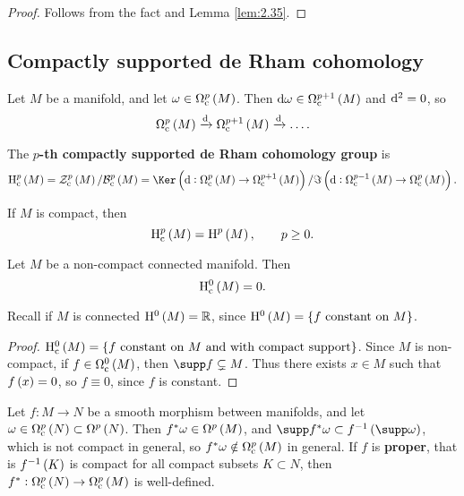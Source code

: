 \begin{proof}
Follows from the fact and Lemma \ref{lem:2.35}.
\end{proof}

\subsection{Compactly supported de Rham cohomology}

Let $ M $ be a manifold, and let $ \omega \in \Omega_\c^p\br{M} $. Then $ \d\omega \in \Omega_\c^{p + 1}\br{M} $ and $ \mathrm{d}^2 = 0 $, so
$$ \Omega_\c^p\br{M} \xrightarrow{\d} \Omega_\c^{p + 1}\br{M} \xrightarrow{\d} \dots. $$

\begin{definition}
The \textbf{$ p $-th compactly supported de Rham cohomology group} is
$$ \H_\c^p\br{M} = \ZZZ_\c^p\br{M} / \BBB_\c^p\br{M} = \Ker \br{\d : \Omega_\c^p\br{M} \to \Omega_\c^{p + 1}\br{M}} / \Im \br{\d : \Omega_\c^{p - 1}\br{M} \to \Omega_\c^p\br{M}}. $$
\end{definition}

\begin{example*}
If $ M $ is compact, then
$$ \H_\c^p\br{M} = \H^p\br{M}, \qquad p \ge 0. $$
\end{example*}

\begin{proposition}
Let $ M $ be a non-compact connected manifold. Then
$$ \H_\c^0\br{M} = 0. $$
\end{proposition}

Recall if $ M $ is connected $ \H^0\br{M} = \RR $, since $ \H^0\br{M} = \cbr{f \ \text{constant on} \ M} $.

\begin{proof}
$ \H_\c^0\br{M} = \cbr{f \ \text{constant on} \ M \ \text{and with compact support}} $. Since $ M $ is non-compact, if $ f \in \Omega_\c^0\br{M} $, then $ \supp f \subsetneq M $. Thus there exists $ x \in M $ such that $ f\br{x} = 0 $, so $ f \equiv 0 $, since $ f $ is constant.
\end{proof}

\begin{remark}
Let $ f : M \to N $ be a smooth morphism between manifolds, and let $ \omega \in \Omega_\c^p\br{N} \subset \Omega^p\br{N} $. Then $ f^*\omega \in \Omega^p\br{M} $, and $ \supp f^*\omega \subset f^{-1}\br{\supp \omega} $, which is not compact in general, so $ f^*\omega \notin \Omega_\c^p\br{M} $ in general. If $ f $ is \textbf{proper}, that is $ f^{-1}\br{K} $ is compact for all compact subsets $ K \subset N $, then $ f^* : \Omega_\c^p\br{N} \to \Omega_\c^p\br{M} $ is well-defined.
\end{remark}

